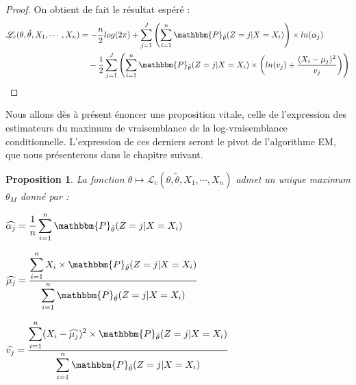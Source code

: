\documentclass[frenchb]{report}
\newcommand{\1}{\mathbbm{1}}
\newcommand{\prob}{\mathbbm{P}}
\newcommand{\lv}{\mathcal{L}}
\newcommand{\thetat}{\tilde{\theta}}
\newtheorem{prop}{Proposition}
\theoremstyle{definition}\newtheorem{defn}{Définition}
\theoremstyle{definition}\newtheorem{exm}{Exemple}
\theoremstyle{definition}\newtheorem{nota}{Notation}
\theoremstyle{definition}\newtheorem{rem}{Remarque}
\begin{document}
\begin{proof}
On obtient de fait le résultat espéré :
\begin{align*}
 \lv_{c}(\theta, \thetat, X_1, \cdots, X_n) &= -\frac{n}{2}log(2\pi)+\sum_{j=1}^J \left(\sum_{i = 1}^n  \prob_{\thetat}(Z=j|X=X_i)\right) \times ln(\alpha_j)\\
&~~~-\frac{1}{2}\sum_{j=1}^J\left(\sum_{i=1}^n \prob_{\thetat}(Z=j|X=X_i)\times\left(ln(v_j)+\frac{(X_i-\mu_j)^2}{v_j}\right)\right)
\end{align*}
\end{proof}

Nous allons dès à présent énoncer une proposition vitale, celle de l'expression des estimateurs du maximum de vraisemblance de la log-vraisemblance conditionnelle. L'expression de ces derniers seront le pivot de l'algorithme EM, que nous présenterons dans le chapitre suivant.

\begin{prop}La fonction $\theta \mapsto \lv_{c}(\theta,\thetat, X_1, \cdots, X_n)$ admet un unique maximum $\theta_M$ donné par : 
\begin{center}
$\widehat{\alpha_j} = \displaystyle\frac{1}{n}\sum_{i=1}^n \prob_{\thetat}(Z=j|X=X_i)$
\end{center}
\begin{center}

$\widehat{\mu_j}= \displaystyle\frac{\displaystyle\sum_{i=1}^n X_i\times\prob_{\thetat}(Z=j|X=X_i)}{\displaystyle\sum_{i=1}^n \prob_{\thetat}(Z=j|X=X_i)}$
\end{center}
\begin{center}

$\widehat{v_j} = \displaystyle\frac{\displaystyle\sum_{i=1}^n (X_i -\widehat{\mu_j})^2 \times\prob_{\thetat}(Z=j|X=X_i)}{\displaystyle\sum_{i=1}^n\prob_{\thetat}(Z=j|X=X_i)}$
\end{center}
\end{prop}

\newpage
\end{document}
